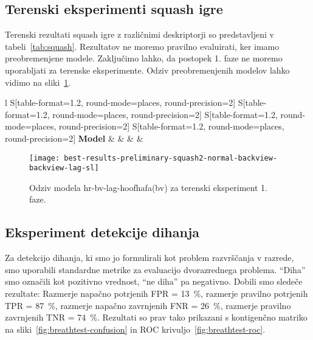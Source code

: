 \subsection{Terenski eksperimenti squash igre}
Terenski rezultati squash igre z različnimi deskriptorji so predstavljeni v tabeli~\ref{tab:squash}.  Rezultatov ne moremo pravilno evaluirati, ker imamo preobremenjene modele. Zaključimo lahko, da postopek 1. faze ne moremo uporabljati za terenske eksperimente. Odziv preobremenjenih modelov lahko vidimo na sliki~\ref{fig:squash-rezultat}.

\begin{table}[!htbp]
	\centering
	\begin{tabular}{l S[table-format=1.2, round-mode=places, round-precision=2] S[table-format=1.2, round-mode=places, round-precision=2] S[table-format=1.2, round-mode=places, round-precision=2] S[table-format=1.2, round-mode=places, round-precision=2]}
		\toprule
		\textbf{Model} & \thead{\corr} & \thead{\rae} & \thead{\rrse} & \thead{\nsv}\\
		\midrule
		\bottomrule
	\end{tabular}
	\caption[Validacijske metrike terenskega testiranja]{Validacijske metrike terenskega testiranja. Tu uporabljamo HOOF in HOOF-HAFA deskriptorje. Modeli so neveljavni.}
	\label{tab:squash}
\end{table}

\begin{figure}[!htbp]
	\centering
	\texttt{[image: best-results-preliminary-squash2-normal-backview-backview-lag-sl]}
	\caption[Odziv modela hr-bv-lag-hoofhafa(bv) za terenski eksperiment 1. faze]{Odziv modela hr-bv-lag-hoofhafa(bv) za terenski eksperiment 1. faze.}
	\label{fig:squash-rezultat}
\end{figure}






















\subsection{Eksperiment detekcije dihanja}
Za detekcijo dihanja, ki smo jo formulirali kot problem razvrščanja v razrede, smo uporabili standardne metrike za evaluacijo dvorazrednega problema. ``Diha'' smo označili kot pozitivno vrednost, ``ne diha'' pa negativno. Dobili smo sledeče rezultate: Razmerje napačno potrjenih FPR = \SI{13}{\%}, razmerje pravilno potrjenih TPR = \SI{87}{\%}, razmerje napačno zavrnjenih FNR = \SI{26}{\%}, razmerje pravilno zavrnjenih TNR = \SI{74}{\%}. Rezultati so prav tako prikazani s kontigenčno matriko na sliki~\ref{fig:breathtest-confusion} in ROC krivuljo~\ref{fig:breathtest-roc}.

